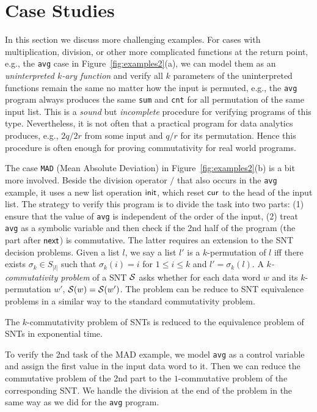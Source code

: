 \section{Case Studies}
\label{sec:cases}


	
In this section we discuss more challenging examples. 
For cases with multiplication, division, or other more complicated functions at the return point, e.g., the \texttt{avg} case in Figure~\ref{fig:examples2}(a), we can model them as an \emph{uninterpreted $k$-ary function} and verify all $k$ parameters of the uninterpreted functions remain the same no matter how the input is permuted, e.g., the \texttt{avg} program always produces the same \texttt{sum} and \texttt{cnt} for all permutation of the same input list. This is a \emph{sound} but \emph{incomplete} procedure for verifying programs of this type. Nevertheless, it is not often that a  practical program for data analytics produces, e.g., $2q/2r$ from some input and $q/r$ for its permutation. Hence this procedure is often enough for proving commutativity for real world programs.

The case \texttt{MAD} (Mean Absolute Deviation) in Figure~\ref{fig:examples2}(b) is a bit more involved. Beside the division operator $/$ that also occurs in the \texttt{avg} example, it uses a new list operation $\mathsf{init}$, which reset $\mathsf{cur}$ to the head of the input list. The strategy to verify this program is to divide the task into two parts: (1) ensure that the value of \texttt{avg} is independent of the order of the input, (2) treat \texttt{avg} as a symbolic variable and then check if the 2nd half of the program (the part after $\mathsf{next}$) is commutative. The latter requires an extension to the SNT decision problems. Given a list $l$, we say a list $l'$ is a $k$-permutation of $l$ iff there exists $\sigma_k\in S_|l|$ such that $\sigma_k(i)=i$ for $1\leq i\leq k$ and $l'=\sigma_k(l)$. A \emph{$k$-commutativity problem} of a SNT ${\mathcal{S} }$ asks whether for each data word $w$ and its $k$-permutation $w'$, ${\mathcal{S} }(w)={\mathcal{S} }(w')$. The problem can be reduce to SNT equivalence problems in a similar way to the standard commutativity problem.

\begin{proposition}\label{prop-snt-kcmm-to-eqv}
	The $k$-commutativity problem of SNTs is reduced to the equivalence problem of SNTs in exponential time. 
\end{proposition}

To verify the 2nd task of the MAD example, we model \texttt{avg} as a control variable and assign the first value in the input data word to it. Then we can reduce the commutative problem of the 2nd part to the $1$-commutative problem of the corresponding SNT. We handle the division at the end of the problem in the same way as we did for the \texttt{avg} program.

